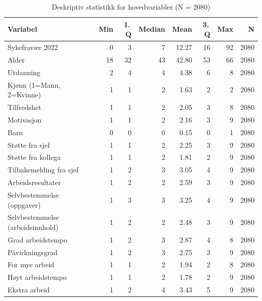 \documentclass[
  12pt,
  a4paper,
  DIV=11,
  numbers=noendperiod]{scrartcl}
\begin{document}
\begin{table}[ht]
\centering
\begin{tabular}{lrrrrrrr}
\toprule
Variabel & Min & 1.\,Q & Median & Mean & 3.\,Q & Max & N \\
\midrule
Sykefravær 2022                 &   0 &   3 &   7 & 12.27 &  16 &  92 & 2080 \\
Alder                            &  18 &  32 &  43 & 42.80 &  53 &  66 & 2080 \\
Utdanning                        &   2 &   4 &   4 &  4.38 &   6 &   8 & 2080 \\
Kjønn (1=Mann, 2=Kvinne)         &   1 &   1 &   2 &  1.63 &   2 &   2 & 2080 \\
Tilfredshet                      &   1 &   1 &   2 &  2.05 &   3 &   8 & 2080 \\
Motivasjon                       &   1 &   1 &   2 &  2.16 &   3 &   9 & 2080 \\
Barn                             &   0 &   0 &   0 &  0.15 &   0 &   1 & 2080 \\
Støtte fra sjef                  &   1 &   1 &   2 &  2.25 &   3 &   9 & 2080 \\
Støtte fra kollega               &   1 &   1 &   2 &  1.81 &   2 &   9 & 2080 \\
Tilbakemelding fra sjef          &   1 &   2 &   3 &  3.05 &   4 &   9 & 2080 \\
Arbeidsresultater                &   1 &   2 &   2 &  2.59 &   3 &   9 & 2080 \\
Selvbestemmelse (oppgaver)       &   1 &   3 &   3 &  3.25 &   4 &   9 & 2080 \\
Selvbestemmelse (arbeidsinnhold) &   1 &   2 &   2 &  2.48 &   3 &   9 & 2080 \\
Grad arbeidstempo                &   1 &   2 &   3 &  2.87 &   4 &   8 & 2080 \\
Påvirkningsgrad                  &   1 &   2 &   3 &  2.75 &   3 &   9 & 2080 \\
For mye arbeid                   &   1 &   1 &   2 &  1.94 &   2 &   8 & 2080 \\
Høyt arbeidstempo                &   1 &   1 &   2 &  1.78 &   2 &   9 & 2080 \\
Ekstra arbeid                    &   1 &   2 &   4 &  3.43 &   5 &   9 & 2080 \\
\bottomrule
\end{tabular}
\caption{Deskriptiv statistikk for hovedvariabler (N = 2080)}
\label{tab:deskriptiv}
\end{table}
\end{document}

